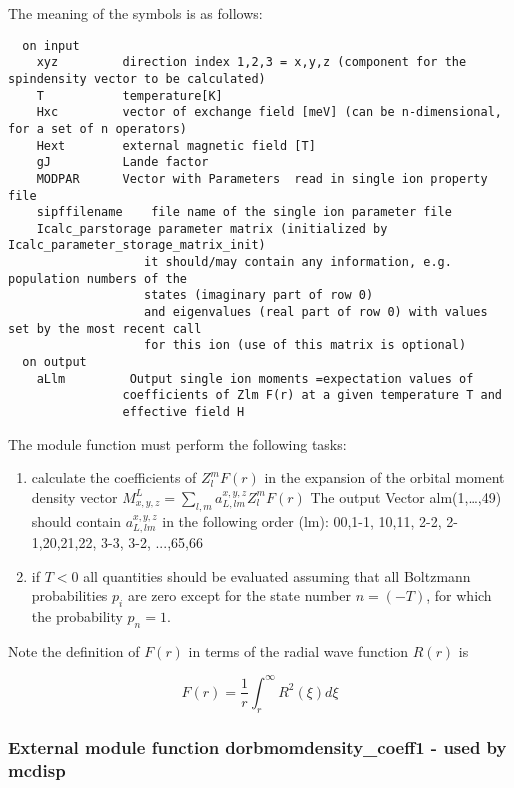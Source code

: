 The meaning of the symbols is as follows:
{\footnotesize
\begin{verbatim}
  on input
    xyz         direction index 1,2,3 = x,y,z (component for the spindensity vector to be calculated)
    T           temperature[K]
    Hxc         vector of exchange field [meV] (can be n-dimensional, for a set of n operators)
    Hext        external magnetic field [T]
    gJ          Lande factor
    MODPAR      Vector with Parameters  read in single ion property file
    sipffilename    file name of the single ion parameter file
    Icalc_parstorage parameter matrix (initialized by Icalc_parameter_storage_matrix_init)
                   it should/may contain any information, e.g. population numbers of the
				   states (imaginary part of row 0)
                   and eigenvalues (real part of row 0) with values set by the most recent call
                   for this ion (use of this matrix is optional)
  on output
    aLlm         Output single ion moments =expectation values of
                coefficients of Zlm F(r) at a given temperature T and
                effective field H
\end{verbatim}
}

The module function must perform the following tasks:
\begin{enumerate}
\item calculate the coefficients of $Z_l^m F(r)$ in the expansion of
      the orbital moment
      density vector $M^L_{x,y,z}=\sum_{l,m} a^{x,y,z}_{L,lm} Z_l^m F(r)$
      The output Vector alm(1,\dots,49) should contain  $a^{x,y,z}_{L,lm}$
      in the following order (lm):  00,1-1, 10,11, 2-2, 2-1,20,21,22, 3-3, 3-2, ...,65,66
\item if $T<0$ all quantities should be evaluated assuming that all Boltzmann probabilities $p_i$
 are zero except for the state number $n=(-T)$, for which the probability $p_n=1$.
\end{enumerate}

Note the definition of $F(r)$ in terms of the radial wave function $R(r)$ is

\begin{equation}
F(r)=\frac{1}{r}\int_r^{\infty} R^2(\xi)d\xi
\end{equation}

\subsubsection{External module function {\prg dorbmomdensity\_coeff1} - used by {\prg mcdisp}}

